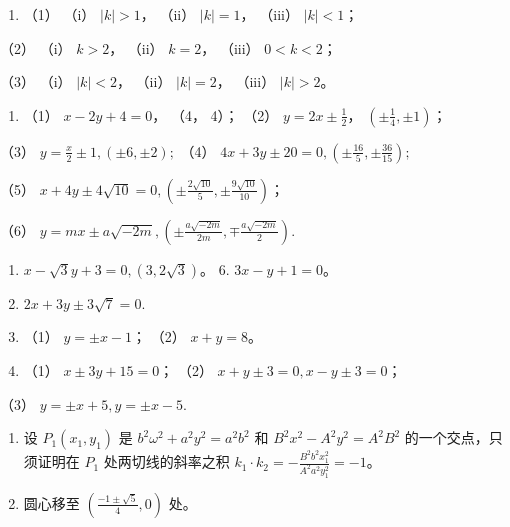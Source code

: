 \begin{enumerate}
\def\labelenumi{\arabic{enumi}.}
\setcounter{enumi}{2}
\tightlist
\item
  （1） （i） \(|k| > 1\)， （ii） \(|k| = 1\)， （iii） \(|k| < 1\)；
\end{enumerate}

（2） （i） \(k > 2\)， （ii） \(k = 2\)， （iii） \(0 < k < 2\)；

（3） （i） \(|k| < 2\)， （ii） \(|k| = 2\)， （iii） \(|k| > 2\)。

\begin{enumerate}
\def\labelenumi{\arabic{enumi}.}
\setcounter{enumi}{3}
\tightlist
\item
  （1） \(x - 2y + 4 = 0\)， （4， 4）； （2）
  \(y = 2x \pm \frac{1}{2}\)， \(\left(\pm \frac{1}{4}, \pm 1\right)\)；
\end{enumerate}

（3） \(y = \frac{x}{2} \pm 1, (\pm 6, \pm 2);\) （4）
\(4x + 3y \pm 20 = 0, \left(\pm \frac{16}{5}, \pm \frac{36}{15}\right);\)

（5）
\(x + 4y \pm 4\sqrt{10} = 0, \left(\pm \frac{2\sqrt{10}}{5}, \pm \frac{9\sqrt{10}}{10}\right)\)；

（6）
\(y = mx \pm a\sqrt{-2m}, \left(\pm \frac{a\sqrt{-2m}}{2m}, \mp \frac{a\sqrt{-2m}}{2}\right).\)

\begin{enumerate}
\def\labelenumi{\arabic{enumi}.}
\setcounter{enumi}{4}
\item
  \(x - \sqrt{3} y + 3 = 0, (3, 2\sqrt{3})\)。 6. \(3x - y + 1 = 0\)。
\item
  \(2x + 3y \pm 3\sqrt{7} = 0.\)
\item
  （1） \(y = \pm x - 1\)； （2） \(x + y = 8\)。
\item
  （1） \(x \pm 3y + 15 = 0\)； （2）
  \(x + y \pm 3 = 0, x - y \pm 3 = 0\)；
\end{enumerate}

（3） \(y = \pm x + 5, y = \pm x - 5.\)

\begin{enumerate}
\def\labelenumi{\arabic{enumi}.}
\setcounter{enumi}{10}
\item
  设 \(P_{1}(x_{1}, y_{1})\) 是
  \(b^{2}\omega^{2} + a^{2}y^{2} = a^{2}b^{2}\) 和
  \(B^{2}x^{2} - A^{2}y^{2} = A^{2}B^{2}\) 的一个交点，只须证明在
  \(P_{1}\) 处两切线的斜率之积
  \(k_{1} \cdot k_{2} = -\frac{B^{2}b^{2}x_{1}^{2}}{A^{2}a^{2}y_{1}^{2}} = -1\)。
\item
  圆心移至 \(\left(\frac{-1 \pm \sqrt{5}}{4}, 0\right)\) 处。
\end{enumerate}

